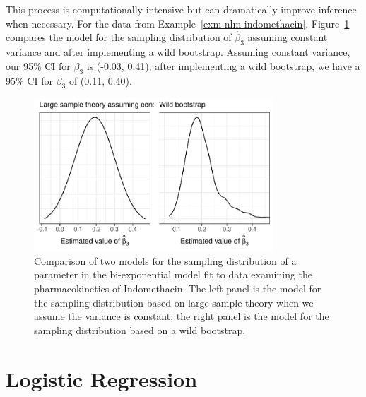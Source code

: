 \documentclass[
  letterpaper,
  DIV=11,
  numbers=noendperiod]{scrreprt}
\theoremstyle{definition}
\theoremstyle{definition}
\theoremstyle{remark}
\begin{document}
This process is computationally intensive but can dramatically improve
inference when necessary. For the data from
Example~\ref{exm-nlm-indomethacin},
Figure~\ref{fig-nlm-indometh-sampdistns-plot} compares the model for the
sampling distribution of \(\widehat{\beta}_3\) assuming constant
variance and after implementing a wild bootstrap. Assuming constant
variance, our 95\% CI for \(\beta_3\) is (-0.03, 0.41); after
implementing a wild bootstrap, we have a 95\% CI for \(\beta_3\) of
(0.11, 0.40).

\begin{figure}

{\centering \includegraphics[width=0.8\textwidth,height=\textheight]{./images/fig-nlm-indometh-sampdistns-plot-1.pdf}

}

\caption{\label{fig-nlm-indometh-sampdistns-plot}Comparison of two
models for the sampling distribution of a parameter in the
bi-exponential model fit to data examining the pharmacokinetics of
Indomethacin. The left panel is the model for the sampling distribution
based on large sample theory when we assume the variance is constant;
the right panel is the model for the sampling distribution based on a
wild bootstrap.}

\end{figure}

\hypertarget{sec-nlm-logistic}{%
\chapter{Logistic Regression}\label{sec-nlm-logistic}}

\providecommand{\norm}[1]{\left\lVert#1\right\rVert}
\providecommand{\abs}[1]{\left\lvert#1\right\rvert}
\providecommand{\dist}[1]{\stackrel{\text{#1}}{\sim}}
\providecommand{\ind}[1]{\mathbb{I}\left(#1\right)}
\providecommand{\bm}[1]{\mathbf{#1}}
\providecommand{\bs}[1]{\boldsymbol{#1}}
\providecommand{\Ell}{\mathcal{L}}
\providecommand{\indep}{\perp\negthickspace\negmedspace\perp}
\end{document}
